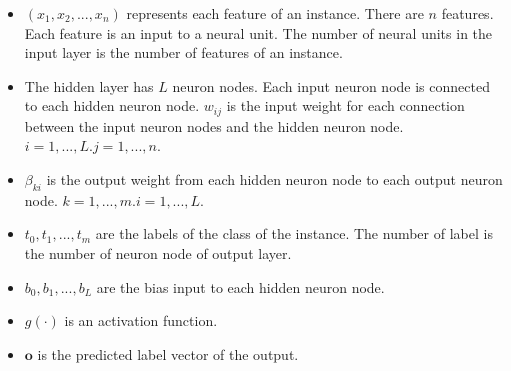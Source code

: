 \documentclass[a4paper, 14pt]{extarticle}
\begin{document}
\begin{itemize}
    \item 
 \( (x_1, x_2, ..., x_n)\) represents each feature of an instance. There are \(n\) features. Each feature is an input to a neural unit. The number of neural units in the input layer is the number of features of an instance. 
 \item The hidden layer has \(L\) neuron nodes. Each input neuron node is connected to each hidden neuron node. \( w_{ij} \) is the input weight for each connection between the input neuron nodes and the hidden neuron node. \( i= 1, ..., L.   j = 1, ..., n.  \) 
 \item \(\beta_{ki}\) is the output weight from each hidden neuron node to each output neuron node. \( k=1, ..., m.   i= 1, ..., L. \)
 \item \( t_0, t_1, ..., t_m\) are the labels of the class of the instance. The number of label is the number of neuron node of output layer. 
 \item \( b_0, b_1, ..., b_L\) are the bias input to each hidden neuron node. 
 \item \( g(\cdot) \) is an activation function. 
 \item \(\mathbf{o}\) is the predicted label vector of the output. 
\end{itemize}
\par 
\end{document}
